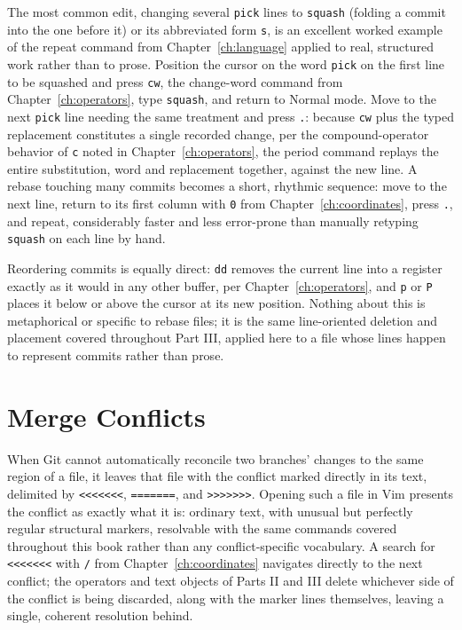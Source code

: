The most common edit, changing several \texttt{pick} lines to \texttt{squash} (folding a commit into the one before it) or its abbreviated form \texttt{s}, is an excellent worked example of the repeat command from Chapter~\ref{ch:language} applied to real, structured work rather than to prose. Position the cursor on the word \texttt{pick} on the first line to be squashed and press \texttt{cw}, the change-word command from Chapter~\ref{ch:operators}, type \texttt{squash}, and return to Normal mode. Move to the next \texttt{pick} line needing the same treatment and press \texttt{.}: because \texttt{cw} plus the typed replacement constitutes a single recorded change, per the compound-operator behavior of \texttt{c} noted in Chapter~\ref{ch:operators}, the period command replays the entire substitution, word and replacement together, against the new line. A rebase touching many commits becomes a short, rhythmic sequence: move to the next line, return to its first column with \texttt{0} from Chapter~\ref{ch:coordinates}, press \texttt{.}, and repeat, considerably faster and less error-prone than manually retyping \texttt{squash} on each line by hand.

Reordering commits is equally direct: \texttt{dd} removes the current line into a register exactly as it would in any other buffer, per Chapter~\ref{ch:operators}, and \texttt{p} or \texttt{P} places it below or above the cursor at its new position. Nothing about this is metaphorical or specific to rebase files; it is the same line-oriented deletion and placement covered throughout Part III, applied here to a file whose lines happen to represent commits rather than prose.

\section{Merge Conflicts}

When Git cannot automatically reconcile two branches' changes to the same region of a file, it leaves that file with the conflict marked directly in its text, delimited by \texttt{<<<<<<<}, \texttt{=======}, and \texttt{>>>>>>>}. Opening such a file in Vim presents the conflict as exactly what it is: ordinary text, with unusual but perfectly regular structural markers, resolvable with the same commands covered throughout this book rather than any conflict-specific vocabulary. A search for \texttt{<<<<<<<} with \texttt{/} from Chapter~\ref{ch:coordinates} navigates directly to the next conflict; the operators and text objects of Parts II and III delete whichever side of the conflict is being discarded, along with the marker lines themselves, leaving a single, coherent resolution behind.

